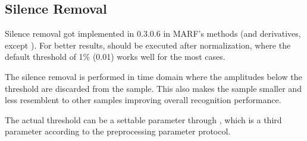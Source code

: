 \subsection{Silence Removal}

Silence removal got implemented in 0.3.0.6 in MARF's
 methods (and derivatives, except ).
For better results,  should be executed after
normalization, where the default threshold of 1\% (0.01) works well
for the most cases.

The silence removal is performed in time domain where the amplitudes
below the threshold are discarded from the sample. This also makes
the sample smaller and less resemblent to other samples improving
overall recognition performance.

The actual threshold can be a settable parameter through
, which is a third parameter according
to the preprocessing parameter protocol.

